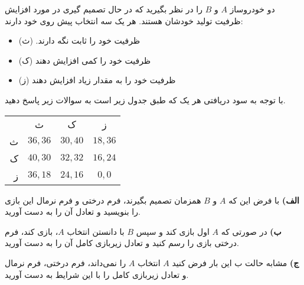 دو خودروساز
$A$
و
$B$
را در نظر بگیرید که در حال تصمیم گیری در مورد افزایش ظرفیت تولید خودشان هستند. هر یک سه انتخاب پیش روی خود دارند:
\begin{itemize}
    \item ظرفیت خود را ثابت نگه دارند. (ث)
    \item ظرفیت خود را کمی افزایش دهند (ک)
    \item ظرفیت خود را به مقدار زیاد افزایش دهند (ز)
\end{itemize}
با توجه به سود دریافتی هر یک که طبق جدول زیر است به سوالات زیر پاسخ دهید.
\LTR 
    \begin{center}
        \begin{tabular}{r | c | c | c |}
            \multicolumn{1}{r}{} &
            \multicolumn{1}{c}{ث} &
            \multicolumn{1}{c}{ک} &
            \multicolumn{1}{c}{ز} \\ \cline{2-4}
            ث       & $36,36$   & $30,40$     & $18,36$  \\ \cline{2-4}
             ک      & $40,30$   & $32,32$     & $16,24$  \\ \cline{2-4}
              ز      & $36,18$   & $24,16$     & $0,0$    \\ \cline{2-4}
        \end{tabular}
    \end{center}
\RTL

\textbf{الف)}
با فرض این که 
$A$
و
$B$
همزمان تصمیم بگیرند، فرم درختی و فرم نرمال این بازی را بنویسید و تعادل آن را به دست آورید.
\vspace{5pt}

\textbf{ب)}
در صورتی که
$A$
اول بازی کند و سپس
$B$
با دانستن انتخاب
$A$،
بازی کند، فرم درختی بازی را رسم کنید و تعادل زیربازی کامل آن را به دست آورید.
\vspace{5pt}



\textbf{ج)}
مشابه حالت ب این بار فرض کنید
$A$
انتخاب
$A$
را نمی‌داند، فرم درختی، فرم نرمال و تعادل زیربازی کامل را با این شرایط به دست آورید.